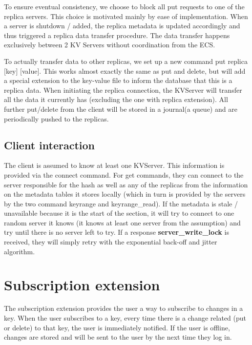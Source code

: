 \documentclass[sigconf]{acmart}
\begin{document}
To ensure eventual consistency, we choose to block all put requests to one of the replica servers. This choice is motivated mainly by ease of implementation. When a server is shutdown / added, the replica metadata is updated accordingly and thus triggered a replica data transfer procedure. The data transfer happens exclusively between 2 KV Servers without coordination from the ECS.

To actually transfer data to other replicas, we set up a new command \colorbox{blue!30}{put replica [key] [value]}. This works almost exactly the same as put and delete, but will add a special extension to the key-value file to inform the database that this is a replica data. When initiating the replica connection, the KVServer will transfer all the data it currently has (excluding the one with replica extension). All further put/delete from the client will be stored in a journal(a queue) and are periodically pushed to the replicas.

\subsection{Client interaction}

The client is assumed to know at least one KVServer. This information is provided via the \colorbox{blue!30}{connect} command. For get commands, they can connect to the server responsible for the hash as well as any of the replicas from the information on the metadata tables it stores locally (which in turn is provided by the servers by the two command \colorbox{blue!30}{keyrange} and \colorbox{blue!30}{keyrange\_read}). If the metadata is stale / unavailable because it is the start of the section, it will try to connect to one random server it knows (it knows at least one server from the assumption) and try until there is no server left to try. If a response \textbf{server\_write\_lock} is received, they will simply retry with the exponential back-off and jitter algorithm. \cite{jitter}

\section{Subscription extension}

The subscription extension provides the user a way to subscribe to changes in a key. When the user subscribes to a key, every time there is a change related (put or delete) to that key, the user is immediately notified. If the user is offline, changes are stored and will be sent to the user by the next time they log in.
\end{document}

